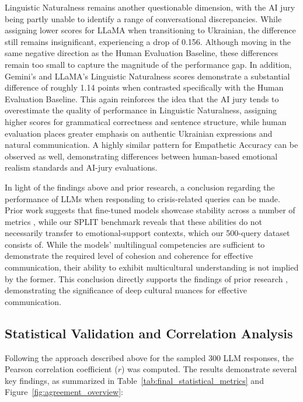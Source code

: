 \documentclass[10pt, twocolumn]{article}
\begin{document}
Linguistic Naturalness remains another questionable dimension, with the AI jury being partly unable to identify a range of conversational discrepancies. While assigning lower scores for LLaMA when transitioning to Ukrainian, the difference still remains insignificant, experiencing a drop of 0.156. Although moving in the same negative direction as the Human Evaluation Baseline, these differences remain too small to capture the magnitude of the performance gap. In addition, Gemini's and LLaMA's Linguistic Naturalness scores demonstrate a substantial difference of roughly 1.14 points when contrasted specifically with the Human Evaluation Baseline. This again reinforces the idea that the AI jury tends to overestimate the quality of performance in Linguistic Naturalness, assigning higher scores for grammatical correctness and sentence structure, while human evaluation places greater emphasis on authentic Ukrainian expressions and natural communication. A highly similar pattern for Empathetic Accuracy can be observed as well, demonstrating differences between human-based emotional realism standards and AI-jury evaluations.


In light of the findings above and prior research, a conclusion regarding the performance of LLMs when responding to crisis-related queries can be made. Prior work suggests that fine-tuned models showcase stability across a number of metrics \cite{nemkova2025crosslingualstabilitybiasinstructiontuned}, while our SPLIT benchmark reveals that these abilities do not necessarily transfer to emotional-support contexts, which our 500-query dataset consists of. While the models' multilingual competencies are sufficient to demonstrate the required level of cohesion and coherence for effective communication, their ability to exhibit multicultural understanding is not implied by the former. This conclusion directly supports the findings of prior research \cite{rystrom2025multilingual}, demonstrating the significance of deep cultural nuances for effective communication.


\subsection{Statistical Validation and Correlation Analysis}

Following the approach described above for the sampled 300 LLM responses, the Pearson correlation coefficient ($r$) was computed. The results demonstrate several key findings, as summarized in Table~\ref{tab:final_statistical_metrics} and Figure~\ref{fig:agreement_overview}:
\end{document}
